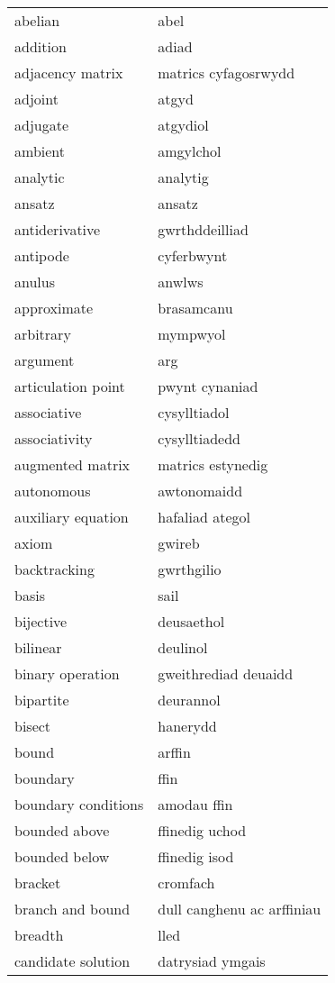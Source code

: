 \begin{supertabular}{p{0.22\textwidth}p{0.22\textwidth}}
\midrule
abelian & abel \\
addition & adiad \\
adjacency matrix & matrics cyfagosrwydd \\
adjoint & atgyd \\
adjugate & atgydiol \\
ambient & amgylchol \\
analytic & analytig \\
ansatz & ansatz \\
antiderivative & gwrthddeilliad \\
antipode & cyferbwynt \\
anulus & anwlws \\
approximate & brasamcanu \\
arbitrary & mympwyol \\
argument & arg \\
articulation point & pwynt cynaniad \\
associative & cysylltiadol \\
associativity & cysylltiadedd \\
augmented matrix & matrics estynedig \\
autonomous & awtonomaidd \\
auxiliary equation & hafaliad ategol \\
axiom & gwireb \\
backtracking & gwrthgilio \\
basis & sail \\
bijective & deusaethol \\
bilinear & deulinol \\
binary operation & gweithrediad deuaidd \\
bipartite & deurannol \\
bisect & hanerydd \\
bound & arffin \\
boundary & ffin \\
boundary conditions & amodau ffin \\
bounded above & ffinedig uchod \\
bounded below & ffinedig isod \\
bracket & cromfach \\
branch and bound & dull canghenu ac arffiniau \\
breadth & lled \\
candidate solution & datrysiad ymgais \\

\end{supertabular}
